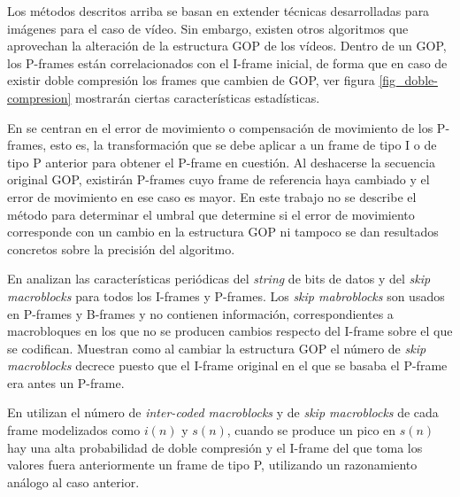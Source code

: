 Los métodos descritos arriba se basan en extender técnicas desarrolladas para imágenes para el caso de vídeo. Sin embargo, existen otros algoritmos que aprovechan la alteración de la estructura GOP de los vídeos. Dentro de un GOP, los P-frames están correlacionados con el I-frame inicial, de forma que en caso de existir doble compresión los frames que cambien de GOP, ver figura \ref{fig_doble-compresion} mostrarán ciertas características estadísticas.

En \cite{farid:2009} se centran en el error de movimiento o compensación de movimiento de los P-frames, esto es, la transformación que se debe aplicar a un frame de tipo I o de tipo P anterior para obtener el P-frame en cuestión. Al deshacerse la secuencia original GOP, existirán P-frames cuyo frame de referencia haya cambiado y el error de movimiento en ese caso es mayor. En este trabajo no se describe el método para determinar el umbral que determine si el error de movimiento corresponde con un cambio en la estructura GOP ni tampoco se dan resultados concretos sobre la precisión del algoritmo. 

En \cite{yao:2017} analizan las características periódicas del \textit{string} de bits de datos y del \textit{skip macroblocks} para todos los I-frames y P-frames. Los \textit{skip mabroblocks} son usados en P-frames y B-frames y no contienen información, correspondientes a macrobloques en los que no se producen cambios respecto del I-frame sobre el que se codifican. Muestran como al cambiar la estructura GOP el número de \textit{skip macroblocks} decrece puesto que el I-frame original en el que se basaba el P-frame era antes un P-frame.

En \cite{vazquez:2012} utilizan el número de \textit{inter-coded macroblocks} y de \textit{skip macroblocks} de cada frame modelizados como $i(n)$ y $s(n)$, cuando se produce un pico en $s(n)$ hay una alta probabilidad de doble compresión y el I-frame del que toma los valores fuera anteriormente un frame de tipo P, utilizando un razonamiento análogo al caso anterior. \\

